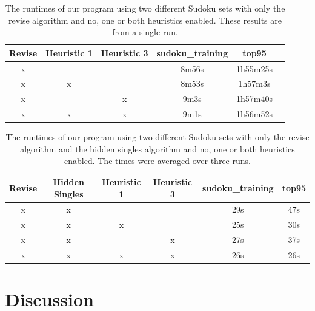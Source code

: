 \documentclass[11pt]{article} %
\begin{document}
\begin{table}[hb]
\begin{center}
\begin{tabular}{c c c c c c}
\hline
 Revise & Heuristic 1 & Heuristic 3 & sudoku\_training & top95 \\
\hline
x &  &  & 8m56s & 1h55m25s \\ %
x & x &  & 8m53s & 1h57m3s \\ %
x &  & x & 9m3s & 1h57m40s \\ %
x & x & x & 9m1s & 1h56m52s \\ %
\hline
\end{tabular}
\end{center}
\caption{The runtimes of our program using two different Sudoku sets with only the revise algorithm and no, one or both heuristics enabled. These results are from a single run.}
\label{tab:heur_results}
\end{table}

\begin{table}[hb]
\begin{center}
\begin{tabular}{c c c c c c}
\hline
 Revise & Hidden Singles & Heuristic 1 & Heuristic 3 & sudoku\_training & top95 \\
\hline
x & x &  &  & 29s & 47s \\ %
x & x & x &  & 25s & 30s \\ %
x & x &  & x & 27s & 37s \\ %
x & x & x & x & 26s & 26s \\ %
\hline
\end{tabular}
\end{center}
\caption{The runtimes of our program using two different Sudoku sets with only the revise algorithm and the hidden singles algorithm and no, one or both heuristics enabled. The times were averaged over three runs.}
\label{tab:hs+heur_results}
\end{table}

\section{Discussion}
\end{document}
